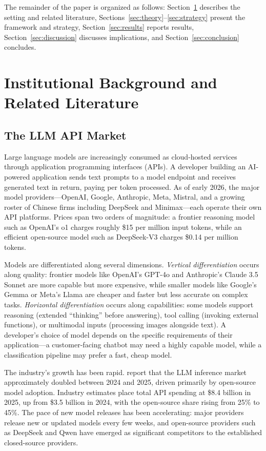 \documentclass[11pt, a4paper]{article}
\begin{document}
The remainder of the paper is organized as follows: Section~\ref{sec:background} describes the setting and related literature, Sections~\ref{sec:theory}--\ref{sec:strategy} present the framework and strategy, Section~\ref{sec:results} reports results, Section~\ref{sec:discussion} discusses implications, and Section~\ref{sec:conclusion} concludes.

\section{Institutional Background and Related Literature}
\label{sec:background}

\subsection{The LLM API Market}

Large language models are increasingly consumed as cloud-hosted services through application programming interfaces (APIs). A developer building an AI-powered application sends text prompts to a model endpoint and receives generated text in return, paying per token processed. As of early 2026, the major model providers---OpenAI, Google, Anthropic, Meta, Mistral, and a growing roster of Chinese firms including DeepSeek and Minimax---each operate their own API platforms. Prices span two orders of magnitude: a frontier reasoning model such as OpenAI's o1 charges roughly \$15 per million input tokens, while an efficient open-source model such as DeepSeek-V3 charges \$0.14 per million tokens.

Models are differentiated along several dimensions. \emph{Vertical differentiation} occurs along quality: frontier models like OpenAI's GPT-4o and Anthropic's Claude 3.5 Sonnet are more capable but more expensive, while smaller models like Google's Gemma or Meta's Llama are cheaper and faster but less accurate on complex tasks. \emph{Horizontal differentiation} occurs along capabilities: some models support reasoning (extended ``thinking'' before answering), tool calling (invoking external functions), or multimodal inputs (processing images alongside text). A developer's choice of model depends on the specific requirements of their application---a customer-facing chatbot may need a highly capable model, while a classification pipeline may prefer a fast, cheap model.

The industry's growth has been rapid. \citet{demirer2025emerging} report that the LLM inference market approximately doubled between 2024 and 2025, driven primarily by open-source model adoption. Industry estimates place total API spending at \$8.4 billion in 2025, up from \$3.5 billion in 2024, with the open-source share rising from 25\% to 45\%. The pace of new model releases has been accelerating: major providers release new or updated models every few weeks, and open-source providers such as DeepSeek and Qwen have emerged as significant competitors to the established closed-source providers.
\end{document}
